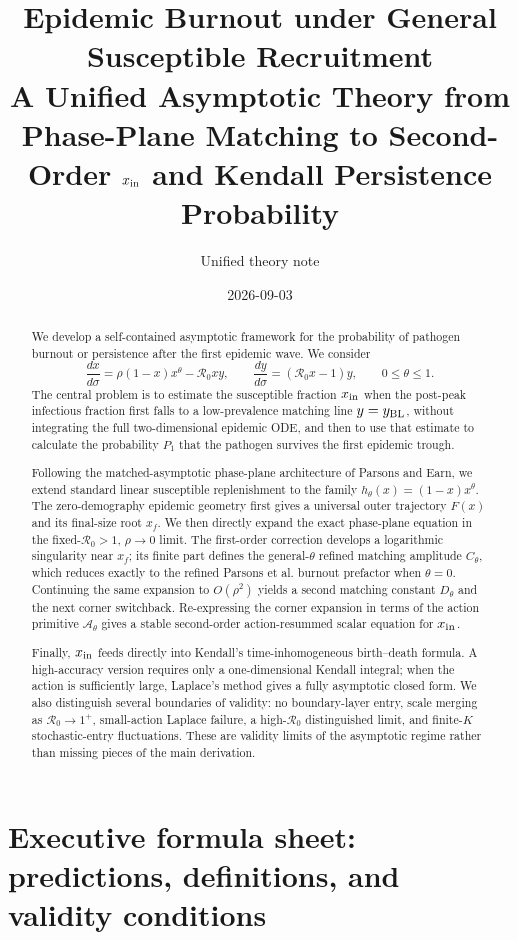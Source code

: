 \documentclass[11pt,a4paper]{article}
\title{Epidemic Burnout under General Susceptible Recruitment\\
\large A Unified Asymptotic Theory from Phase-Plane Matching to Second-Order $x_{\rm in}$ and Kendall Persistence Probability}
\author{Unified theory note}
\date{2026-09-03}
\newcommand{\Rzero}{\mathcal R_0}
\newcommand{\BL}{y_{\rm BL}}
\newcommand{\xin}{x_{\rm in}}
\newcommand{\Pone}{P_1}
\begin{document}
\maketitle

\begin{abstract}
We develop a self-contained asymptotic framework for the probability of pathogen burnout or persistence after the first epidemic wave. We consider
\[
\frac{dx}{d\sigma}=\rho(1-x)x^\theta-\Rzero xy,
\qquad
\frac{dy}{d\sigma}=(\Rzero x-1)y,
\qquad 0\leq\theta\leq1.
\]
The central problem is to estimate the susceptible fraction $\xin$ when the post-peak infectious fraction first falls to a low-prevalence matching line $y=\BL$, without integrating the full two-dimensional epidemic ODE, and then to use that estimate to calculate the probability $\Pone$ that the pathogen survives the first epidemic trough.

Following the matched-asymptotic phase-plane architecture of Parsons and Earn, we extend standard linear susceptible replenishment to the family $h_\theta(x)=(1-x)x^\theta$. The zero-demography epidemic geometry first gives a universal outer trajectory $F(x)$ and its final-size root $x_f$. We then directly expand the exact phase-plane equation in the fixed-$\Rzero>1$, $\rho\to0$ limit. The first-order correction develops a logarithmic singularity near $x_f$; its finite part defines the general-$\theta$ refined matching amplitude $C_\theta$, which reduces exactly to the refined Parsons et al. burnout prefactor when $\theta=0$. Continuing the same expansion to $O(\rho^2)$ yields a second matching constant $D_\theta$ and the next corner switchback. Re-expressing the corner expansion in terms of the action primitive $\mathcal A_\theta$ gives a stable second-order action-resummed scalar equation for $x_{\rm in}$.

Finally, $x_{\rm in}$ feeds directly into Kendall's time-inhomogeneous birth--death formula. A high-accuracy version requires only a one-dimensional Kendall integral; when the action is sufficiently large, Laplace's method gives a fully asymptotic closed form. We also distinguish several boundaries of validity: no boundary-layer entry, scale merging as $\Rzero\to1^+$, small-action Laplace failure, a high-$\Rzero$ distinguished limit, and finite-$K$ stochastic-entry fluctuations. These are validity limits of the asymptotic regime rather than missing pieces of the main derivation.
\end{abstract}

\section{Executive formula sheet: predictions, definitions, and validity conditions}
\label{sec:executive}
\end{document}
